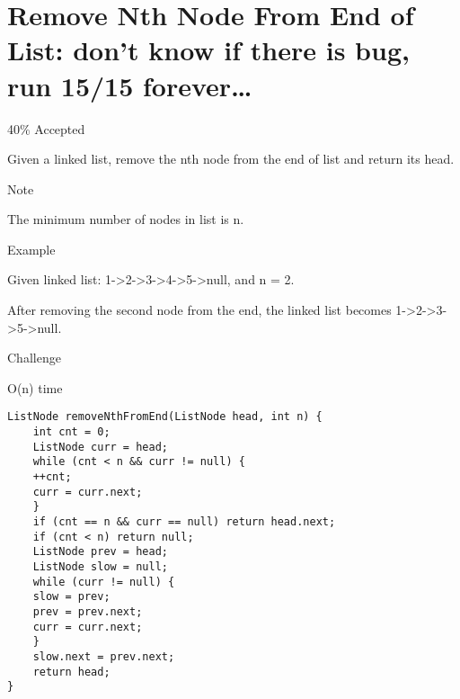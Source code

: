 \documentclass[12pt]{book}
\begin{document}
\chapter{Remove Nth Node From End of List: don't know if there is bug, run 15/15 forever\ldots{}}
\label{sec-56}

40\% Accepted

Given a linked list, remove the nth node from the end of list and return its head.

Note

The minimum number of nodes in list is n.

Example

Given linked list: 1->2->3->4->5->null, and n = 2.

After removing the second node from the end, the linked list becomes 1->2->3->5->null.

Challenge

O(n) time
\lstset{language=java,label= ,caption= ,numbers=none}
\begin{lstlisting}
ListNode removeNthFromEnd(ListNode head, int n) {
    int cnt = 0;
    ListNode curr = head;
    while (cnt < n && curr != null) {
	++cnt;
	curr = curr.next;
    }
    if (cnt == n && curr == null) return head.next;
    if (cnt < n) return null;
    ListNode prev = head;
    ListNode slow = null;
    while (curr != null) {
	slow = prev;
	prev = prev.next;
	curr = curr.next;
    }
    slow.next = prev.next;
    return head;
}
\end{lstlisting}
\end{document}
